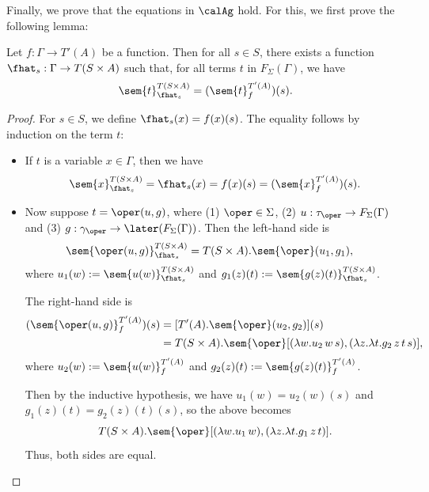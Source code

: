 Finally, we prove that the equations in $\calAg$ hold. For this, we first prove
the following lemma:
%
\begin{lemma}

    Let $f : \Gamma \to T'(A)$ be a function. Then for all $s \in S$, there exists a
    function $\fhat_s : \Gamma \to T(S \times A)$ such that, for all terms $t$ in
    $F_\Sigma(\Gamma)$, we have
    \[ \sem{t}_{\fhat_s}^{T(S \times A)} = (\sem{t}_f^{T'(A)})(s). \]
\end{lemma}

\begin{proof}
    For $s \in S$, we define $\fhat_s(x) = f(x)(s)$.
    The equality follows by induction on the term $t$:
    \begin{itemize}
        \item If $t$ is a variable $x \in \Gamma$, then we have
        \[ \sem{x}_{\fhat_s}^{T(S \times A)} 
          = \fhat_s(x) 
          = f(x)(s) 
          = (\sem{x}_f^{T'(A)})(s).
        \]

        \item Now suppose $t = \oper(u, g)$, where (1) $\oper \in \Sigma$, 
        (2) $u : \tau_\oper \to F_\Sigma(\Gamma)$ and 
        (3) $g : \gamma_\oper \to \later (F_\Sigma(\Gamma))$. Then the left-hand side is
        \begin{align*}
            \sem{\oper(u, g)}_{\fhat_s}^{T(S \times A)}
              &= T(S \times A).\sem{\oper}(u_1, g_1),
        \end{align*}
        where $u_1(w) := \sem{u(w)}_{\fhat_s}^{T(S \times A)}$ and 
        $g_1(z)(t) := \sem{g(z)(t)}_{\fhat_s}^{T(S \times A)}$.

        The right-hand side is
        \begin{align*}
            (\sem{\oper(u, g)}_f^{T'(A)})(s)
              &= [T'(A).\sem{\oper}(u_2, g_2)](s) \\
              &= T(S \times A).\sem{\oper}[
                  (\lambda w. u_2\, w\, s), 
                  (\lambda z. \lambda t. g_2\, z\, t\, s)],
        \end{align*}
        where $u_2(w) := \sem{u(w)}_f^{T'(A)}$ and $g_2(z)(t) := \sem{g(z)(t)}_f^{T'(A)}$.
        
        Then by the inductive hypothesis, we have $u_1(w) = u_2(w)(s)$ and
        $g_1(z)(t) = g_2(z)(t)(s)$, so the above becomes
        \[ T(S \times A).\sem{\oper}[
                  (\lambda w. u_1\, w), 
                  (\lambda z. \lambda t. g_1\, z\, t)].
        \]
        Thus, both sides are equal.

    \end{itemize}
\end{proof}

